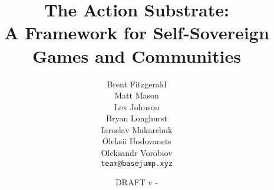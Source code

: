 \documentclass[letterpaper,twocolumn]{article}
\title{The Action Substrate:\\A Framework for Self-Sovereign Games and Communities}
\author{
Brent Fitzgerald \\
Matt Mason \\
Lex Johnson \\
Bryan Longhurst \\
Iaroslav Makarchuk \\
Oleksii Hodovanets \\
Oleksandr Vorobiov
 \\[1ex]
\texttt{team@basejump.xyz}
}
\date{DRAFT v - \DTMtoday}
\newcommand{\configureRaggedItems}{%
  \let\olditem\item
  \renewcommand{\item}{\olditem\RaggedRight}%
}
\newcommand{\restoreItems}{%
  \let\item\olditem
}
\begin{document}
\maketitle
\configureRaggedItems













\break

\break

\break


\clearpage
\restoreItems
\raggedright


\end{document}
